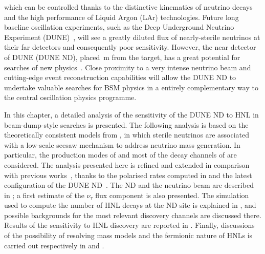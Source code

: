 which can be controlled thanks to the distinctive kinematics of neutrino decays and %
the high performance of Liquid Argon (LAr) technologies.
Future long baseline oscillation experiments, such as the Deep Underground Neutrino Experiment %
(DUNE)~\cite{Abi:2018dnh}, will see a greatly diluted flux of nearly-sterile neutrinos %
at their far detectors and consequently poor sensitivity.
However, the near detector of DUNE (DUNE ND), placed \,m from the target, has a great potential %
for searches of new physics~\cite{Adams:2013qkq}.
Close proximity to a very intense neutrino beam and cutting-edge event reconstruction capabilities %
will allow the DUNE ND to undertake valuable searches for BSM physics in a entirely complementary way %
to the central oscillation physics programme. 

In this chapter, a detailed analysis of the sensitivity of the DUNE ND to HNL in beam-dump-style searches is presented.
The following analysis is based on the theoretically consistent models from , %
in which sterile neutrinos are associated with a low-scale seesaw mechanism to address neutrino mass generation.
In particular, the production modes of  and most of the decay channels of  %
are considered.
The analysis presented here is refined and extended in comparison with previous works~\cite{Krasnov:2019kdc, Adams:2013qkq}, %
thanks to the polarised rates computed in  and the latest configuration of the DUNE ND~\cite{Abi:2020wmh}.
The ND and the neutrino beam are described in ; %
a first estimate of the $\nu_\tau$ flux component is also presented.
The simulation used to compute the number of HNL decays at the ND site is explained in , %
and possible backgrounds for the most relevant discovery channels are discussed there.
Results of the sensitivity to HNL discovery are reported in .
Finally, discussions of the possibility of resolving mass models and the fermionic nature of HNLs is %
carried out respectively in  and .

